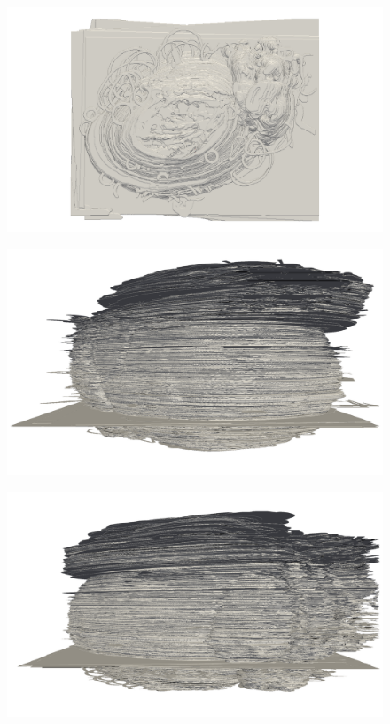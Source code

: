 	\begin{figure}
	  \centering
	  \includegraphics[width=0.9\textheight]{Ch7/Figs/Rat28/contours/whole_positive_z_rigid}
	  \caption{}
	  \label{fig:image1.png}
	\end{figure}

	\begin{figure}
	  \centering
	  \includegraphics[width=0.9\textheight]{Ch7/Figs/Rat28/contours/whole_positive_x_size}
	  \caption{}
	  \label{fig:image1.png}
	\end{figure}

	\begin{figure}
	  \centering
	  \includegraphics[width=0.9\textheight]{Ch7/Figs/Rat28/contours/whole_negative_x_size}
	  \caption{}
	  \label{fig:image1.png}
	\end{figure}

